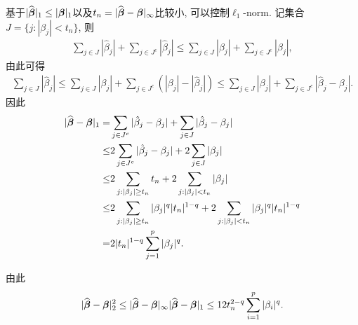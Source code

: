 基于$|\mbox{$\widehat{\mbox{\boldmath $\beta$}}$}|_1 \leq |\mbox{\boldmath $\beta$}|_1$以及$t_n=|\mbox{$\widehat{\mbox{\boldmath $\beta$}}$}-\mbox{\boldmath $\beta$}|_\infty$比较小, 可以控制$\ell_1$-norm. 记集合$J=\{j: |\beta_j| < t_n \}$, 则
\begin{align*}
  \sum_{j \in J} |\hat{\beta}_j|+  \sum_{j \in J^c} |\hat{\beta}_j| \leq \sum_{j \in J} |\beta_j|+  \sum_{j \in J^c} |\beta_j|,
\end{align*}
由此可得
\begin{align*}
    \sum_{j \in J} |\hat{\beta}_j| \leq \sum_{j \in J} |\beta_j|+   \sum_{j \in J^c} \left(|\beta_j|-|\hat{\beta}_j|\right)\leq \sum_{j \in J} |\beta_j|+   \sum_{j \in J^c} |\hat{\beta}_j-\beta_j|.
\end{align*}
因此
\begin{align*}
    |\mbox{$\widehat{\mbox{\boldmath $\beta$}}$}-\mbox{\boldmath $\beta$}|_1=& \sum_{j \in J^c} |\hat{\beta}_j-\beta_j|+\sum_{j \in J} |\hat{\beta}_j-\beta_j|\\
\leq & 2 \sum_{j \in J^c} |\hat{\beta}_j-\beta_j|+2\sum_{j \in J} |\beta_j|\\
\leq & 2 \sum_{j:|\beta_j| \geq t_n } t_n+2\sum_{j:|\beta_j| < t_n } |\beta_j|\\
\leq & 2\sum_{j:|\beta_j| \geq t_n } |\beta_j|^q |t_n|^{1-q}+2\sum_{j:|\beta_j| < t_n } |\beta_j|^q |t_n|^{1-q}\\
= & 2 |t_n|^{1-q} \sum_{j=1}^p |\beta_j|^q.
\end{align*}

由此
\begin{align*}
    |\mbox{$\widehat{\mbox{\boldmath $\beta$}}$}-\mbox{\boldmath $\beta$}|^2_2\leq   |\mbox{$\widehat{\mbox{\boldmath $\beta$}}$}-\mbox{\boldmath $\beta$}|_\infty |\mbox{$\widehat{\mbox{\boldmath $\beta$}}$}-\mbox{\boldmath $\beta$}|_1 \leq 12 t_n^{2-q} \sum_{i=1}^p |\beta_i|^q.
\end{align*}

